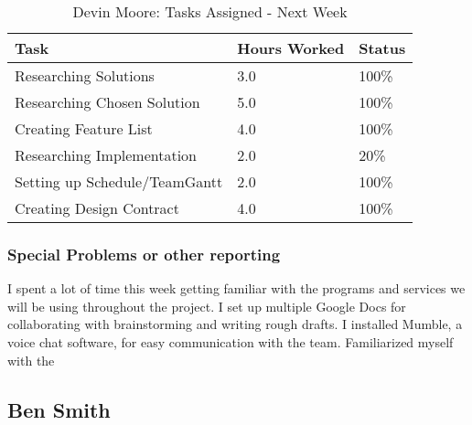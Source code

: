 \documentclass[12pt,article,compsoc]{IEEEtran}
\begin{document}
	\begin{table}[ht]
	\renewcommand{\arraystretch}{1.3}
		\caption{Devin Moore: Tasks Assigned - Next Week}
		
		\label{Summary of Devin Moore's activites: this week}
		
		\centering
		\begin{tabular}{p{5.5cm}|p{1cm}|p{1cm}}

		\hline
		\bfseries 	Task		 							& \bfseries Hours Worked	& \bfseries Status	\\
		\hline\hline
					Researching Solutions					& 3.0						& 100\%				\\	%
					Researching Chosen Solution				& 5.0						& 100\%				\\
					Creating Feature List					& 4.0						& 100\%				\\	%
					Researching Implementation				& 2.0						& 20\%				\\
					Setting up Schedule/TeamGantt			& 2.0						& 100\%				\\	%
					Creating Design Contract				& 4.0						& 100\%				\\
		\hline
		\end{tabular}
	\end{table}

	\subsubsection*{Special Problems or other reporting}
	I spent a lot of time this week getting familiar with the programs and services we will be using throughout the project. I set up multiple Google Docs for collaborating with brainstorming and writing rough drafts. I installed Mumble, a voice chat software, for easy communication with the team. Familiarized myself with the
	 

\subsection{Ben Smith}
\end{document}
